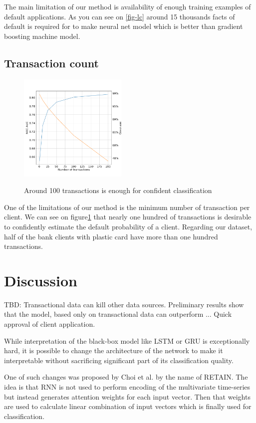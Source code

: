 \documentclass{sigkddExp}
\begin{document}
The main limitation of our method is availability of enough training examples of default applications. As you can see on \ref{fig-lc} around 15 thousands facts of default is required for to make neural net model which is better than gradient boosting machine model.

\subsection{Transaction count}

\begin{figure}[h]
  \caption{Around 100 transactions is enough for confident classification}
  \includegraphics[width=0.46\textwidth]{information-vs-accuracy.png}
  \label{fig-tc}
\end{figure}

One of the limitations of our method is the minimum number of transaction per client. We can see on figure\ref{fig-tc} that nearly one hundred of transactions is desirable to confidently estimate the default probability of a client. Regarding our dataset, half of the bank clients with plastic card have more than one hundred transactions.

\section{Discussion}

TBD: Transactional data can kill other data sources. Preliminary results show that the model, based only on transactional data can outperform ... Quick approval of client application.

While interpretation of the black-box model like LSTM or GRU is exceptionally hard, it is possible to change the architecture of the network to make it interpretable without sacrificing significant part of its classification quality.

One of such changes was proposed by Choi et al.\cite{DBLP:journals/corr/ChoiBSSS16} by the name of RETAIN. The idea is that RNN is not used to perform encoding of the multivariate time-series but instead generates attention weights for each input vector. Then that weights are used to calculate linear combination of input vectors which is finally used for classification.
\end{document}

